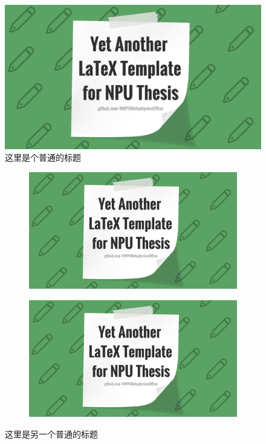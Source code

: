 \documentclass[lang=chs, degree=master, blindreview=false, adobe=false]{yanputhesis}
\begin{document}
\begin{figure}[htb]
    \centering
    \includegraphics[scale=0.2]{poster.png}
    \caption{
        这里是个普通的标题
    }
    \label{fig:example}
\end{figure}

\begin{figure}[htb]
    \centering
    \begin{minipage}[t]{0.96\textwidth}
        \centering
        \begin{subfigure}[t]{0.47\textwidth}
            \centering
            \includegraphics[scale=0.1]{poster.png}
            \caption{\label{subfig:example2-subfig1}}
        \end{subfigure}
        \begin{subfigure}[t]{0.47\textwidth}
            \centering
            \includegraphics[scale=0.1]{poster.png}
            \caption{\label{subfig:example2-subfig2}}
        \end{subfigure}
    \end{minipage}
    \caption{这里是另一个普通的标题}
    \label{fig:example2}
\end{figure}
\end{document}
